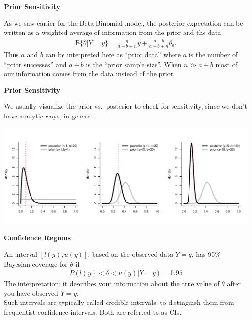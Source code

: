 \documentclass[12pt,xcolor=svgnames]{beamer}
\newcommand{\bl}{\color{blue}}
\newcommand{\theme}{\color{FireBrick}}
\newcommand{\mr}[1]{\mathrm{#1}}
\newcommand{\sk}{\vspace{.4cm}}
\newcommand{\chap}[1]{{\theme \Large \bf #1} \sk}
\begin{document}
\begin{frame}
\chap{Prior Sensitivity}

As we saw earlier for the Beta-Binomial model, the posterior expectation can be written as a weighted average of information from the prior and the data
\begin{align*}
\mr{E}\{\theta|Y=y\} =   \frac{n}{a + b +n} \bar{y} + \frac{a+b}{a+b+n} \theta_0.
\end{align*}
Thus $a$ and $b$ can be interpreted here as ``prior data'' where $a$ is the number of ``prior successes'' and $a+b$ is the ``prior sample size''. When $n\gg a+b$ most of our information comes from the data instead of the prior. 
\end{frame}

\begin{frame}
\chap{Prior Sensitivity}

We usually visualize the prior vs.~posterior to check for sensitivity, since we don't have analytic ways, in general. 
\begin{center}
\includegraphics[scale=0.5,trim=30 50 0 20]{prior_sens}
\end{center}
\end{frame}


\begin{frame}
\chap{Confidence Regions}

An interval $[l(y), u(y)]$, based on the observed data $Y=y$, has 95\% Bayesian coverage for $\theta$ if
\begin{align*}
P(l(y) <\theta < u(y)|Y=y)=0.95
\end{align*}
The interpretation: it describes your information about the true value of $\theta$ after you have observed $Y=y$.\\

\sk
Such intervals are typically called {\bl credible intervals}, to distinguish them from frequentist confidence intervals. Both are referred to as CIs. 

\end{frame}
\end{document}
